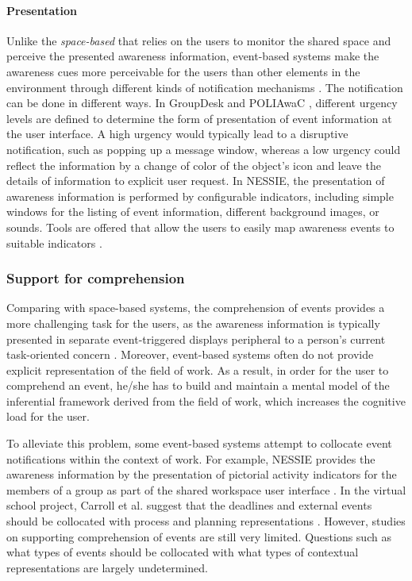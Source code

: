 
\paragraph*{Presentation} %
\label{par:presentation}
Unlike the \emph{space-based} that relies on the users to monitor the shared space and perceive the presented awareness information, event-based systems make the awareness cues more perceivable for the users than other elements in the environment through different kinds of notification mechanisms \cite{McCrickard2003}. The notification can be done in different ways. In GroupDesk \cite{Fuchs1995} and POLIAwaC \cite{sohlenkamp2000po}, different urgency levels are defined to determine the form of presentation of event information at the user interface. A high urgency would typically lead to a disruptive notification, such as popping up a message window, whereas a low urgency could reflect the information by a change of color of the object's icon and leave the details of information to explicit user request. In NESSIE, the presentation of awareness information is performed by configurable indicators, including simple windows for the listing of event information, different background images, or sounds. Tools are offered that allow the users to easily map awareness events to suitable indicators \cite{prinz1999a}.

\subsubsection{Support for comprehension} %
\label{ssub:support_for_comprehension}
Comparing with space-based systems, the comprehension of events provides a more challenging task for the users, as the awareness information is typically presented in separate event-triggered displays peripheral to a person's current task-oriented concern \cite{carroll2003a}. Moreover, event-based systems often do not provide explicit representation of the field of work. As a result, in order for the user to comprehend an event, he/she has to build and maintain a mental model of the inferential framework derived from the field of work, which increases the cognitive load for the user. 

To alleviate this problem, some event-based systems attempt to collocate event notifications within the context of work. For example, NESSIE provides the awareness information by the presentation of pictorial activity indicators for the members of a group as part of the shared workspace user interface \cite{prinz1999a}. In the virtual school project, Carroll et al. suggest that the deadlines and external events should be collocated with process and planning representations \cite{carroll2003a}. However, studies on supporting comprehension of events are still very limited. Questions such as what types of events should be collocated with what types of contextual representations are largely undetermined.  
